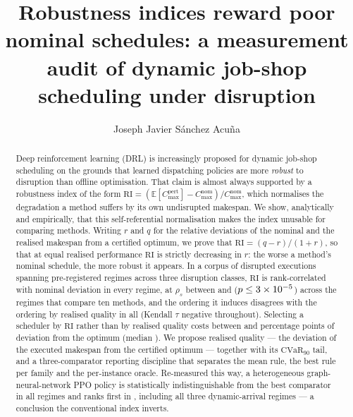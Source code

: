 \documentclass[a4paper,fleqn]{cas-sc}
\newcommand{\Cmax}{C_{\max}}
\newcommand{\RI}{\mathrm{RI}}
\newcommand{\CVaR}{\mathrm{CVaR}}
\begin{document}
\let\WriteBookmarks\relax
\def\floatpagepagefraction{1}
\def\textpagefraction{.001}


\title[mode=title]{Robustness indices reward poor nominal schedules: a
measurement audit of dynamic job-shop scheduling under disruption}

\author[1]{Joseph Javier Sánchez Acuña}
\cormark[1]



\begin{abstract}
Deep reinforcement learning (DRL) is increasingly proposed for dynamic
job-shop scheduling on the grounds that learned dispatching policies are more
\emph{robust} to disruption than offline optimisation. That claim is almost
always supported by a robustness index of the form
$\RI=(\mathbb{E}[\Cmax^{\text{pert}}]-\Cmax^{\text{nom}})/\Cmax^{\text{nom}}$,
which normalises the degradation a method suffers by its own undisrupted
makespan. We show, analytically and empirically, that this self-referential
normalisation makes the index unusable for comparing methods. Writing $r$ and
$q$ for the relative deviations of the nominal and the realised makespan from a
certified optimum, we prove that $\RI=(q-r)/(1+r)$, so that at equal realised
performance $\RI$ is strictly decreasing in $r$: the worse a method's nominal
schedule, the more robust it appears. In a corpus of \NRunsDisrupted{} disrupted
executions spanning \NRegimes{} pre-registered regimes across three disruption
classes, $\RI$ is rank-correlated with nominal deviation in every regime, at
$\rho_s$ between \RhoConfMin{} and \RhoConfMax{} ($p\le3\times10^{-5}{}$) across the
\NConfRegimes{} regimes that compare ten methods, and the ordering it induces
disagrees with the ordering by realised quality in all \NRegimes{} (Kendall
$\tau$ negative throughout). Selecting a scheduler by $\RI$ rather than
by realised quality costs between \PenaltyMin{} and \PenaltyMax{} percentage
points of deviation from the optimum (median \PenaltyMedian{}). We propose
realised quality --- the deviation of the executed makespan from the certified
optimum --- together with its $\CVaR_{90}$ tail, and a three-comparator
reporting discipline that separates the mean rule, the best rule per family and
the per-instance oracle. Re-measured this way, a heterogeneous
graph-neural-network PPO policy is statistically indistinguishable from the best
comparator in all \NRegimes{} regimes and ranks first in \NRLBest{}, including
all three dynamic-arrival regimes --- a conclusion the conventional index
inverts.
\end{abstract}
\end{document}
